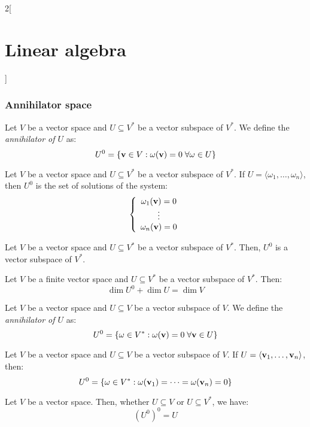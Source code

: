 \documentclass[../../../main.tex]{subfiles}
\begin{document}
\begin{multicols}{2}[\section{Linear algebra}]
    \subsubsection*{Annihilator space}
    \begin{definition}
        Let $V$ be a vector space and $U\subseteq V^*$ be a vector subspace of $V^*$. We define the \textit{annihilator of $U$} as:
        $$U^0=\{\boldsymbol{\mathrm{v}}\in V:\omega(\boldsymbol{\mathrm{v}})=0\;\forall\omega\in U\}$$
    \end{definition}
    \begin{lemma}
        Let $V$ be a vector space and $U\subseteq V^*$ be a vector subspace of $V^*$. If $U=\langle\omega_1,\ldots,\omega_n\rangle$, then $U^0$ is the set of solutions of the system:
        $$\left\{
            \begin{array}{c}
                \omega_1(\boldsymbol{\mathrm{v}})=0 \\
                \vdots                         \\
                \omega_n(\boldsymbol{\mathrm{v}})=0
            \end{array}
            \right.$$
    \end{lemma}
    \begin{lemma}
        Let $V$ be a vector space and $U\subseteq V^*$ be a vector subspace of $V^*$. Then, $U^0$ is a vector subspace of $V^*$.
    \end{lemma}
    \begin{theorem}
        Let $V$ be a finite vector space and $U\subseteq V^*$ be a vector subspace of $V^*$. Then: $$\dim U^0+\dim U=\dim V$$
    \end{theorem}
    \begin{definition}
        Let $V$ be a vector space and $U\subseteq V$ be a vector subspace of $V$. We define the \textit{annihilator of $U$} as:
        $$U^0=\{\omega\in V^*:\omega(\boldsymbol{\mathrm{v}})=0\;\forall\boldsymbol{\mathrm{v}}\in U\}$$
    \end{definition}
    \begin{lemma}
        Let $V$ be a vector space and $U\subseteq V$  be a vector subspace of $V$. If $U=\langle\boldsymbol{\mathrm{v}}_1,\ldots,\boldsymbol{\mathrm{v}}_n\rangle$, then: $$U^0=\{\omega\in V^*:\omega(\boldsymbol{\mathrm{v}}_1)=\cdots=\omega(\boldsymbol{\mathrm{v}}_n)=0\}$$
    \end{lemma}
    \begin{prop}
        Let $V$ be a vector space. Then, whether $U\subseteq V$ or $U\subseteq V^*$, we have: $${(U^0)}^0=U$$
    \end{prop}

\end{multicols}
\end{document}
